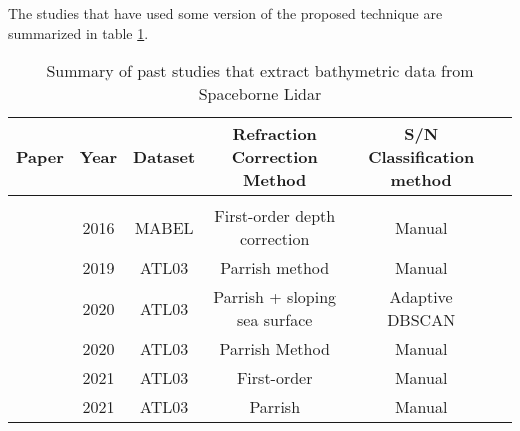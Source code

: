 The studies that have used some version of the proposed technique are summarized in table \ref{tab:researchsummary}.

\begin{landscape}
      \begin{table}
            \caption{Summary of past studies that extract bathymetric data from Spaceborne Lidar}
            \label{tab:researchsummary}
            \raggedright
            \begin{tabular}{rccccc}
                  \midrule
                  Paper                              & Year & Dataset & Refraction Correction Method  & S/N Classification method     \\ %
                  \hline                                                                                                              \\ %
                  \citeauthor{Forfinski-Sarkozi2016} & 2016 & MABEL   & First-order depth correction  & Manual                        \\ %
                  \citeauthor{Parrish2019}           & 2019 & ATL03   & Parrish method                & Manual                        \\ %
                  \citeauthor{Ma2020}                & 2020 & ATL03   & Parrish + sloping sea surface & Adaptive DBSCAN               \\ %
                  \citeauthor{Thomas2021d}           & 2020 & ATL03   & Parrish Method                & Manual                        \\ %
                  \citeauthor{Albright2021}          & 2021 & ATL03   & First-order                   & Manual                        \\ %
                  \citeauthor{Babbel2021a}           & 2021 & ATL03   & Parrish                       & Manual                        \\ %

\end{tabular}
\end{table}
\end{landscape}
